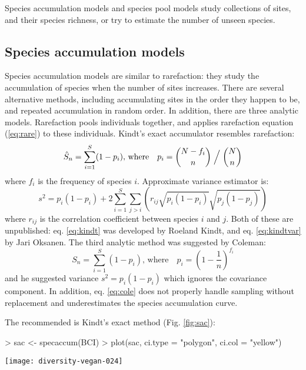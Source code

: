 \documentclass[a4paper,10pt]{amsart}
\begin{document}
Species accumulation models and species pool models study collections
of sites, and their species richness, or try to estimate the number of
unseen species.

\subsection{Species accumulation models}

Species accumulation models are similar to rarefaction: they study the
accumulation of species when the number of sites increases.  There are
several alternative methods, including accumulating sites in the order
they happen to be, and repeated accumulation in random order.  In
addition, there are three analytic models.  Rarefaction pools
individuals together, and applies rarefaction equation (\ref{eq:rare})
to these individuals.  Kindt's exact accumulator resembles rarefaction:
\begin{equation}
\label{eq:kindt}
\hat S_n = \sum_{i=1}^S (1 - p_i), \, \text{where} \quad p_i = {N- f_i
\choose n} \Bigm / {N \choose n}
\end{equation}
where $f_i$ is the frequency of species $i$.  Approximate variance
estimator is:
\begin{equation}
\label{eq:kindtvar}
s^2 = p_i (1 - p_i) + 2 \sum_{i=1}^S \sum_{j>i} \left( r_{ij}
  \sqrt{p_i(1-p_i)} \sqrt{p_j (1-p_j)}\right)
\end{equation}
where $r_{ij}$ is the correlation coefficient between species $i$ and
$j$.  Both of these are unpublished: eq. \ref{eq:kindt} was developed
by Roeland Kindt, and eq. \ref{eq:kindtvar} by Jari Oksanen. The third
analytic method was suggested by Coleman:
\begin{equation}
\label{eq:cole}
S_n = \sum_{i=1}^S (1 - p_i), \, \text{where} \quad p_i = \left(1 - \frac{1}{n}\right)^{f_i}
\end{equation}
and he suggested variance $s^2 = p_i (1-p_i)$ which ignores the
covariance component.  In addition, eq. \ref{eq:cole} does not
properly handle sampling without replacement and underestimates the
species accumulation curve.

The recommended is Kindt's exact method (Fig. \ref{fig:sac}):
\begin{Schunk}
\begin{Sinput}
> sac <- specaccum(BCI)
> plot(sac, ci.type = "polygon", ci.col = "yellow")
\end{Sinput}
\end{Schunk}
\begin{SCfigure}
\texttt{[image: diversity-vegan-024]}
\caption{Species accumulation curve for the BCI data; exact method.}
\label{fig:sac}
\end{SCfigure}
\end{document}
